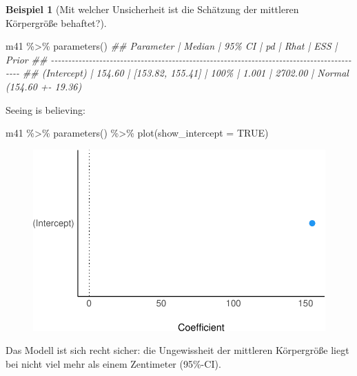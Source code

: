 \documentclass[
  a4paper,
  DIV=11]{scrreprt}
\newenvironment{Shaded}{\begin{snugshade}}{\end{snugshade}}
\newcommand{\AttributeTok}[1]{\textcolor[rgb]{0.40,0.45,0.13}{#1}}
\newcommand{\ConstantTok}[1]{\textcolor[rgb]{0.56,0.35,0.01}{#1}}
\newcommand{\DocumentationTok}[1]{\textcolor[rgb]{0.37,0.37,0.37}{\textit{#1}}}
\newcommand{\FunctionTok}[1]{\textcolor[rgb]{0.28,0.35,0.67}{#1}}
\newcommand{\NormalTok}[1]{\textcolor[rgb]{0.00,0.23,0.31}{#1}}
\newcommand{\SpecialCharTok}[1]{\textcolor[rgb]{0.37,0.37,0.37}{#1}}
\theoremstyle{definition}
\newtheorem{example}{Beispiel}[chapter]
\theoremstyle{remark}
\begin{document}
\leavevmode{}%
\begin{example}[Mit welcher Unsicherheit ist die Schätzung der mittleren
Körpergröße behaftet?]\label{exm-kung5}

\begin{Shaded}
\begin{Highlighting}[]
\NormalTok{m41 }\SpecialCharTok{\%\textgreater{}\%} 
  \FunctionTok{parameters}\NormalTok{()}
\DocumentationTok{\#\# Parameter   | Median |           95\% CI |   pd |  Rhat |     ESS |                    Prior}
\DocumentationTok{\#\# {-}{-}{-}{-}{-}{-}{-}{-}{-}{-}{-}{-}{-}{-}{-}{-}{-}{-}{-}{-}{-}{-}{-}{-}{-}{-}{-}{-}{-}{-}{-}{-}{-}{-}{-}{-}{-}{-}{-}{-}{-}{-}{-}{-}{-}{-}{-}{-}{-}{-}{-}{-}{-}{-}{-}{-}{-}{-}{-}{-}{-}{-}{-}{-}{-}{-}{-}{-}{-}{-}{-}{-}{-}{-}{-}{-}{-}{-}{-}{-}{-}{-}{-}{-}{-}{-}{-}{-}{-}{-}{-}}
\DocumentationTok{\#\# (Intercept) | 154.60 | [153.82, 155.41] | 100\% | 1.001 | 2702.00 | Normal (154.60 +{-} 19.36)}
\end{Highlighting}
\end{Shaded}

Seeing is believing:

\begin{Shaded}
\begin{Highlighting}[]
\NormalTok{m41 }\SpecialCharTok{\%\textgreater{}\%} 
  \FunctionTok{parameters}\NormalTok{() }\SpecialCharTok{\%\textgreater{}\%} 
  \FunctionTok{plot}\NormalTok{(}\AttributeTok{show\_intercept =} \ConstantTok{TRUE}\NormalTok{)}
\end{Highlighting}
\end{Shaded}

\begin{figure}[H]

{\centering \includegraphics{./gauss_files/figure-pdf/unnamed-chunk-6-1.pdf}

}

\end{figure}

Das Modell ist sich recht sicher: die Ungewissheit der mittleren
Körpergröße liegt bei nicht viel mehr als einem Zentimeter (95\%-CI).

\end{example}
\end{document}

